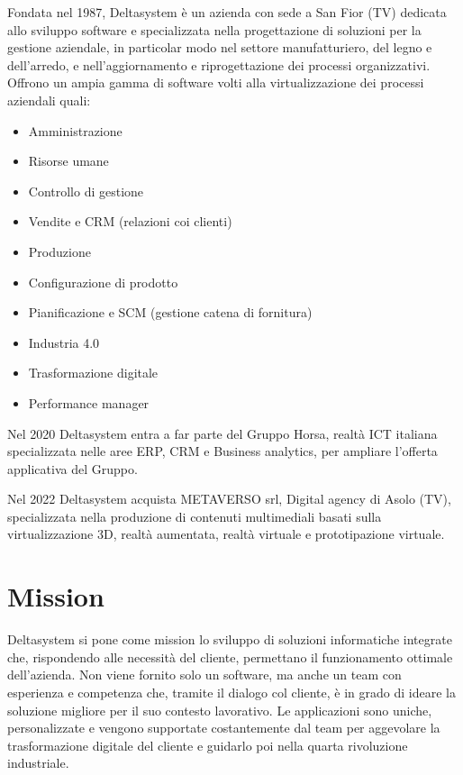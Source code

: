 \documentclass[target=bach,aauheader=,style=]{thud}
\begin{document}
Fondata nel 1987, Deltasystem è un azienda con sede a San Fior (TV) dedicata allo sviluppo software e specializzata nella progettazione di soluzioni per la gestione aziendale, in particolar modo nel settore manufatturiero, del legno e dell’arredo, e nell’aggiornamento e riprogettazione dei processi organizzativi.
Offrono un ampia gamma di software volti alla virtualizzazione dei processi aziendali quali:
\begin{itemize}
    \setlength{\itemsep}{0pt} %
    \item Amministrazione
    \item Risorse umane
    \item Controllo di gestione
    \item Vendite e CRM (relazioni coi clienti)
    \item Produzione
    \item Configurazione di prodotto
    \item Pianificazione e SCM (gestione catena di fornitura)
    \item Industria 4.0
    \item Trasformazione digitale
    \item Performance manager
\end{itemize}
Nel 2020 Deltasystem entra a far parte del Gruppo Horsa, realtà ICT italiana specializzata nelle aree ERP, CRM e Business analytics, per ampliare l’offerta applicativa del Gruppo. %

Nel 2022 Deltasystem acquista METAVERSO srl, Digital agency di Asolo (TV), specializzata nella produzione di contenuti multimediali basati sulla virtualizzazione 3D, realtà aumentata, realtà virtuale e prototipazione virtuale. 
\section{Mission}
Deltasystem si pone come mission lo sviluppo di soluzioni informatiche integrate che, rispondendo alle necessità del cliente, permettano il funzionamento ottimale dell'azienda.
Non viene fornito solo un software, ma anche un team con esperienza e competenza che, tramite il dialogo col cliente, è in grado di ideare la soluzione migliore per il suo contesto lavorativo.
Le applicazioni sono uniche, personalizzate e vengono supportate costantemente dal team per aggevolare la trasformazione digitale del cliente e guidarlo poi nella quarta rivoluzione industriale. 
\end{document}
